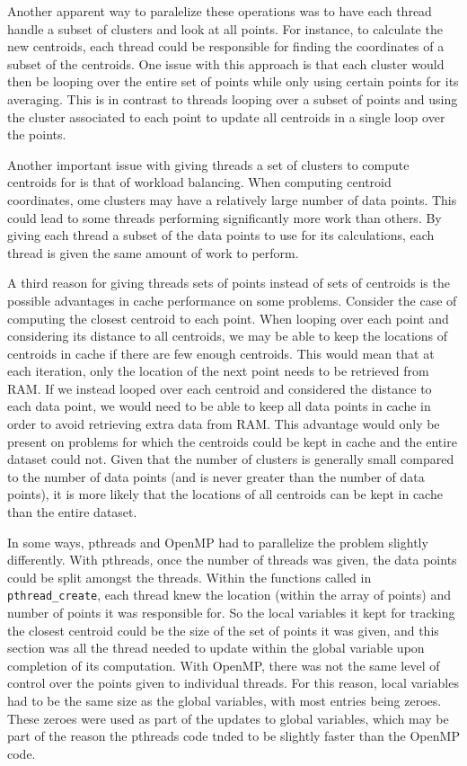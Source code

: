 \documentclass[a4paper]{article}
\begin{document}
Another apparent way to paralelize these operations was to have each thread handle a subset of clusters and look at all points. For instance, to
calculate the new centroids, each thread could be responsible for finding the coordinates of a subset of the centroids. One issue with this approach
is that each cluster would then be looping over the entire set of points while only using certain points for its averaging. This is in contrast to
threads looping over a subset of points and using the cluster associated to each point to update all centroids in a single loop over the points.

Another important issue with giving threads a set of clusters to compute centroids for is that of workload balancing. When computing centroid
coordinates, ome clusters may have a relatively large number
of data points. This could lead to some threads performing significantly more work than others. By giving each thread a subset of the data points to
use for its calculations, each thread is given the same amount of work to perform.

A third reason for giving threads sets of points instead of sets of centroids is the possible advantages in cache performance on some problems.
Consider the case of computing the closest centroid to each point. When looping over each point and considering its distance to all centroids, we may
be able to keep the locations of centroids in cache if there are few enough centroids. This would mean that at each iteration, only the location of
the next point needs to be retrieved from RAM. If we instead looped over each centroid and considered the distance to each data point, we would need
to be able to keep all data points in cache in order to avoid retrieving extra data from RAM. This advantage would only be present on problems for
which the centroids could be kept in cache and the entire dataset could not. Given that the number of clusters is generally small
compared to the number of data points (and is never greater than the number of data points), it is more likely that the locations of all centroids can
be kept in cache than the entire dataset.

In some ways, pthreads and OpenMP had to parallelize the problem slightly differently. With pthreads, once the number of threads was given, the data
points could be split amongst the threads. Within the functions called in \texttt{pthread\_create}, each thread knew the location (within the array of
points) and number of points
it was responsible for. So the local variables it kept for tracking the closest centroid could be the size of the set of points it was given, and this
section was all the thread needed to update within the global variable upon completion of its computation. With OpenMP, there was not the same level
of control over the points given to individual threads. For this reason, local variables had to be the same size as the global variables, with most
entries being zeroes. These zeroes were used as part of the updates to global variables, which may be part of the reason the pthreads code tnded to be
slightly faster than the OpenMP code.
\end{document}
